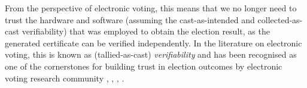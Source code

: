 From the perspective of electronic voting, this means that
we no longer need to trust the hardware and software (assuming the 
cast-as-intended and collected-as-cast verifiability)
that was employed to obtain the election result, as the generated
certificate can be verified independently. In the literature on
electronic voting, this is known as (tallied-as-cast) \emph{verifiability} and has
been recognised as one of the cornerstones for building trust in
election outcomes by electronic voting research community \citep{Chaum:2004:SBR}
 \citep{5958051}, \citep{Benaloh:1994:RSE:195058.195407},  
 \citep{Delaune:2010:VPT}, \citep{Bernhard:2017:PES}.
 
%
%

  


